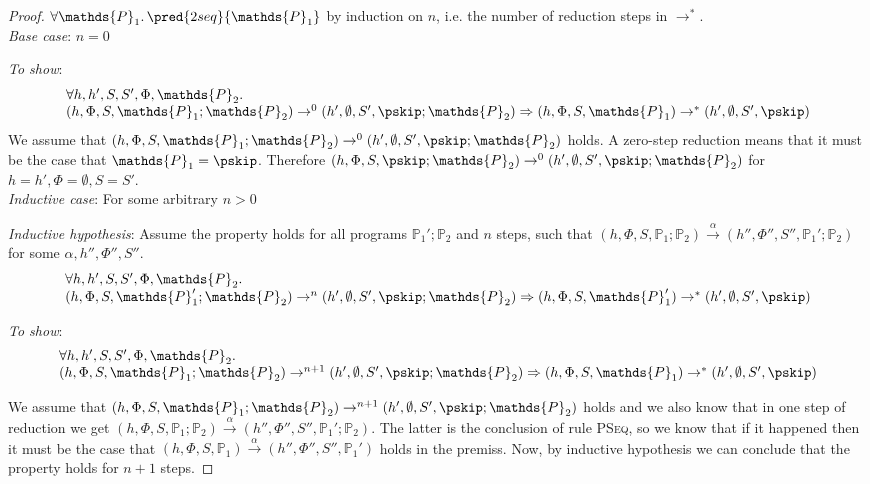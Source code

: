 {\parindent0pt
\begin{proof}
$\forall \mathds{P}_1 \ldotp \pred{2seq}{\mathds{P}_1}$ by induction on $n$, i.e. the number of reduction steps in $\rightarrow^*$. \\

\textit{Base case}: $n = 0$

\textit{To show}:
\[
\begin{array}{l}
\forall h, h', S, S', \Phi, \mathds{P}_2 \ldotp \\ 
	(h, \Phi, S, \mathds{P}_1; \mathds{P}_2) \rightarrow^0 (h', \emptyset, S', \pskip; \mathds{P}_2)
	\Rightarrow
	(h, \Phi, S, \mathds{P}_1) \rightarrow^* (h', \emptyset, S', \pskip)
\end{array}
\]
We assume that $(h, \Phi, S, \mathds{P}_1; \mathds{P}_2) \rightarrow^0 (h', \emptyset, S', \pskip; \mathds{P}_2)$ holds. A zero-step reduction means that it must be the case that $\mathds{P}_1 = \pskip$. Therefore $(h, \Phi, S, \pskip; \mathds{P}_2) \rightarrow^0 (h', \emptyset, S', \pskip; \mathds{P}_2)$ for $h = h', \Phi = \emptyset, S = S'$. \\

\textit{Inductive case}: For some arbitrary $n > 0$

\textit{Inductive hypothesis}: Assume the property holds for all programs $\mathds{P}_1'; \mathds{P}_2$ and $n$ steps, such that $(h, \Phi, S, \mathds{P}_1; \mathds{P}_2) \xrightarrow{\alpha} (h'', \Phi'', S'', \mathds{P}_1'; \mathds{P}_2)$ for some $\alpha, h'', \Phi'', S''$.
\[
\begin{array}{l}
\forall h, h', S, S', \Phi, \mathds{P}_2 \ldotp \\ 
	(h, \Phi, S, \mathds{P}_1'; \mathds{P}_2) \rightarrow^n (h', \emptyset, S', \pskip; \mathds{P}_2)
	\Rightarrow
	(h, \Phi, S, \mathds{P}_1') \rightarrow^* (h', \emptyset, S', \pskip)
\end{array}
\]

\textit{To show}:
\[
\begin{array}{l}
\forall h, h', S, S', \Phi, \mathds{P}_2 \ldotp \\ 
	(h, \Phi, S, \mathds{P}_1; \mathds{P}_2) \rightarrow^{n+1} (h', \emptyset, S', \pskip; \mathds{P}_2)
	\Rightarrow
	(h, \Phi, S, \mathds{P}_1) \rightarrow^* (h', \emptyset, S', \pskip)
\end{array}
\]

We assume that $(h, \Phi, S, \mathds{P}_1; \mathds{P}_2) \rightarrow^{n+1} (h', \emptyset, S', \pskip; \mathds{P}_2)$ holds and we also know that in one step of reduction we get $(h, \Phi, S, \mathds{P}_1; \mathds{P}_2) \xrightarrow{\alpha} (h'', \Phi'', S'', \mathds{P}_1'; \mathds{P}_2)$. The latter is the conclusion of rule \textsc{PSeq}, so we know that if it happened then it must be the case that $(h, \Phi, S, \mathds{P}_1) \xrightarrow{\alpha} (h'', \Phi'', S'', \mathds{P}_1')$ holds in the premiss. Now, by inductive hypothesis we can conclude that the property holds for $n + 1$ steps.

\end{proof}
}

